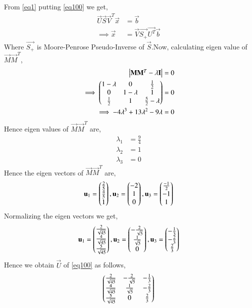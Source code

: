 \documentclass[journal,12pt,twocolumn]{IEEEtran}
\begin{document}
From \eqref{eq1} putting \eqref{eq100} we get,
\begin{align}
\vec{U}\vec{S}\vec{V}^T\vec{x} & = \vec{b}\\
\implies\vec{x} &= \vec{V}\vec{S_+}\vec{U^T}\vec{b}\label{eqX}\label{eqX}
\end{align}
Where $\vec{S_+}$ is Moore-Penrose Pseudo-Inverse of $\vec{S}$.Now, calculating eigen value of $\vec{M}\vec{M}^T$,
\begin{align}
\begin{vmatrix}\mathbf{M}\mathbf{M}^T - \lambda\mathbf{I}\end{vmatrix} &= 0\\
\implies\begin{pmatrix}1-\lambda&0&\frac{1}{2}\\0&1-\lambda&1\\\frac{1}{2}&1&\frac{5}{2}-\lambda\end{pmatrix} &=0\\
\implies-4\lambda^3+13 \lambda^2-9\lambda &=0
\end{align}
Hence eigen values of $\vec{M}\vec{M}^T$ are,
\begin{align}
\lambda_1 &=\frac{9}{4}\\
\lambda_2 &= 1\\
\lambda_3 &=0
\end{align}
Hence the eigen vectors of $\vec{M}\vec{M}^T$ are,
\begin{align}
\mathbf{u}_1=\begin{pmatrix}\frac{2}{5}\\\frac{4}{5}\\1\end{pmatrix},
\mathbf{u}_2=\begin{pmatrix}-2\\1\\0\end{pmatrix},
\mathbf{u}_3=\begin{pmatrix}\frac{-1}{2}\\-1\\1\end{pmatrix}
\end{align}
Normalizing the eigen vectors we get,
\begin{align}
\mathbf{u}_1=\begin{pmatrix}\frac{2}{\sqrt{45}}\\\frac{4}{\sqrt{45}}\\\frac{5}{\sqrt{45}}\end{pmatrix},
\mathbf{u}_2=\begin{pmatrix}-\frac{2}{\sqrt{5}}\\\frac{1}{\sqrt{5}}\\0\end{pmatrix},
\mathbf{u}_3=\begin{pmatrix}-\frac{1}{3}\\-\frac{2}{3}\\\frac{2}{3}\end{pmatrix}
\end{align}
Hence we obtain $\vec{U}$ of \eqref{eq100} as follows,
\begin{align}
\begin{pmatrix}\frac{2}{\sqrt{45}}& -\frac{2}{\sqrt{5}}&-\frac{1}{3}\\
\frac{4}{\sqrt{45}}&\frac{1}{\sqrt{5}}&-\frac{2}{3}\\
\frac{5}{\sqrt{45}}&0&\frac{2}{3}\end{pmatrix}
\label{eqU}
\end{align}
\end{document}
